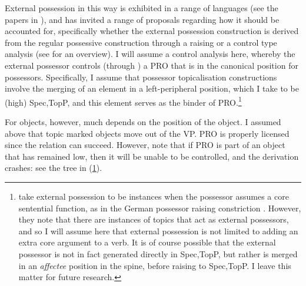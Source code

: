 \documentclass[output=paper
,modfonts
,nonflat]{langsci/langscibook}
\begin{document}


\noindent External possession in this way is exhibited in a range of languages (see the papers in \citealp{paynebarshi1999}), and has invited a range of proposals regarding how it should be accounted for, specifically whether the external possession construction is derived from the regular possessive construction through a raising or a control type analysis (see \citealt{deal2013b} for an overview). 
I will assume a control analysis here, whereby the external possessor controls (through \agree) a PRO that is in the canonical position for possessors.
Specifically, I assume that possessor topicalisation constructions involve the merging of an element in a left-peripheral position, which I take to be (high) Spec,TopP, and this element serves as the binder of PRO.\footnote{\citet{paynebarshi1999b} take external possession to be instances when the possessor assumes a core sentential function, as in the German possessor raising constriction \citep{hole2005}. However, they note that there are instances of topics that act as external possessors, and so I will assume here that external possession is not limited to adding an extra core argument to a verb.
It is of course possible that the external possessor is not in fact generated directly in Spec,TopP, but rather is merged in an \emph{affectee} position in the spine, before raising to Spec,TopP. 
I leave this matter for future research.} 


For objects, however, much depends on the position of the object. I assumed above that topic marked objects move out of the VP. PRO is properly licensed since the \agree{} relation can succeed.
However, note that if PRO is part of an object that has remained low, then it will be unable to be controlled, and the derivation crashes: see the tree in (\ref{tree:objposs}).

\begin{figure}
\begin{exe}
\ex \label{tree:objposs}
\end{exe} \vspace{-0.9cm}
\end{figure}
\end{document}
